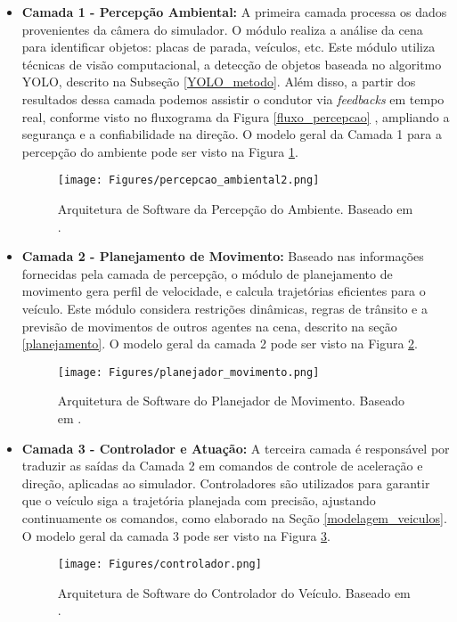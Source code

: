 \begin{itemize}
\item \textbf{Camada 1 - Percepção Ambiental:} A primeira camada processa os dados provenientes da câmera do simulador. O módulo realiza a análise da cena para identificar objetos: placas de parada, veículos, etc. Este módulo utiliza técnicas de visão computacional, a detecção de objetos baseada no algoritmo YOLO, descrito na Subseção \ref{YOLO_metodo}. Além disso, a partir dos resultados dessa camada podemos assistir o condutor via \textit{feedbacks} em tempo real, conforme visto no fluxograma da Figura \ref{fluxo_percepcao}%
, ampliando a segurança e a confiabilidade na direção. O modelo geral da Camada 1 para a percepção do ambiente pode ser visto na Figura \ref{percepcao_ambiental}.

\begin{figure}[H]
\centering
\texttt{[image: Figures/percepcao\_ambiental2.png]}
\caption{Arquitetura de Software da Percepção do Ambiente. Baseado em .}
\label{percepcao_ambiental}
\end{figure}

\item \textbf{Camada 2 - Planejamento de Movimento:} Baseado nas informações fornecidas pela camada de percepção, o módulo de planejamento de movimento gera perfil de velocidade, e calcula trajetórias eficientes para o veículo. Este módulo considera restrições dinâmicas, regras de trânsito e a previsão de movimentos de outros agentes na cena, descrito na seção \ref{planejamento}.  O modelo geral da camada 2 pode ser visto na Figura \ref{planejador_movimento}.
\begin{figure}[H]
\centering
\texttt{[image: Figures/planejador\_movimento.png]}
\caption{Arquitetura de Software do Planejador de Movimento. Baseado em .}
\label{planejador_movimento}
\end{figure}

\item \textbf{Camada 3 - Controlador e Atuação:} A terceira camada é responsável por traduzir as saídas da Camada 2 em comandos de controle de aceleração e direção, aplicadas ao simulador. Controladores são utilizados para garantir que o veículo siga a trajetória planejada com precisão, ajustando continuamente os comandos, como elaborado na Seção \ref{modelagem_veiculos}. O modelo geral da camada 3 pode ser visto na Figura \ref{controlador}.

\begin{figure}[H]
\centering
\texttt{[image: Figures/controlador.png]}
\caption{Arquitetura de Software do Controlador do Veículo. Baseado em .}
\label{controlador}
\end{figure}
\end{itemize}


